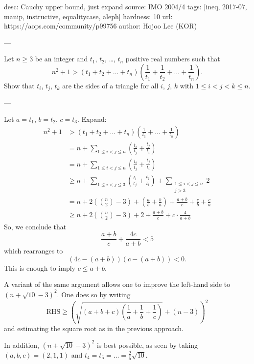 desc: Cauchy upper bound, just expand
source: IMO 2004/4
tags: [ineq, 2017-07, manip, instructive, equalitycase, aleph]
hardness: 10
url: https://aops.com/community/p99756
author: Hojoo Lee (KOR)

---

Let $n \ge 3$ be an integer
and $t_1$, $t_2$, \dots, $t_n$ positive real numbers such that
\[ n^2+1 > \left(t_1 + t_2 + \dots + t_n\right)
  \left( \frac{1}{t_1} + \frac{1}{t_2} + \dots + \frac{1}{t_n} \right). \]
Show that $t_i$, $t_j$, $t_k$ are the sides of a triangle
for all $i$, $j$, $k$ with $1 \le i < j < k \le n$.

---

Let $a = t_1$, $b = t_2$, $c = t_3$.
Expand:
\begin{align*}
  n^2+1 &> \left(t_1 + t_2 + \dots + t_n\right)
    \left( \frac{1}{t_1} + \dots + \frac{1}{t_n} \right) \\
  &= n + \sum_{1 \le i < j \le n}
    \left( \frac{t_i}{t_j} + \frac{t_j}{t_i} \right) \\
  &= n + \sum_{1 \le i < j \le n}
    \left( \frac{t_i}{t_j} + \frac{t_j}{t_i} \right) \\
  &\ge n + \sum_{1 \le i < j \le 3}
    \left( \frac{t_i}{t_j} + \frac{t_j}{t_i} \right)
    + \sum_{\substack{1 \le i < j \le n \\ j > 3 }} 2 \\
  &= n + 2\left( \binom n2-3 \right)
    + \left( \frac ab + \frac ba \right)
    + \frac{a+b}{c} + \frac{c}{b} + \frac{c}{a} \\
  &\ge n + 2\left( \binom n2-3 \right) + 2
    + \frac{a+b}{c} + c \cdot \frac{4}{a+b}
\end{align*}
So, we conclude that
\[ \frac{a+b}{c} + \frac{4c}{a+b} < 5 \]
which rearranges to
\[ \left( 4c-(a+b) \right)\left( c-(a+b) \right) < 0. \]
This is enough to imply $c \le a+b$.

\begin{remark*}
  A variant of the same argument allows one to improve
  the left-hand side to $(n+\sqrt{10}-3)^2$.
  One does so by writing
  \[ \text{RHS} \ge \left( \sqrt{\left( a+b+c \right)
    \left( \frac1a+\frac1b+\frac1c \right)} + (n-3) \right)^2 \]
  and estimating the square root as in the previous approach.

  In addition, $(n+\sqrt{10}-3)^2$ is best possible,
  as seen by taking $(a,b,c) = (2,1,1)$ and $t_4 = t_5 = \dots = \frac25 \sqrt{10}$.
\end{remark*}
